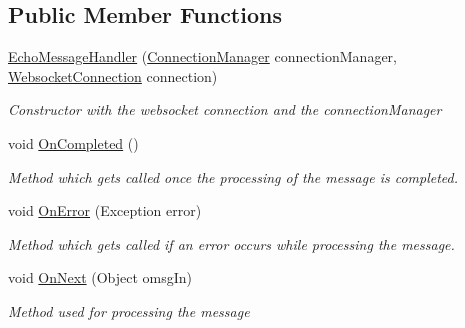 \subsection*{Public Member Functions}
\begin{DoxyCompactItemize}
\item 
\hyperlink{class_web_analyzer_1_1_server_1_1_message_handler_1_1_echo_message_handler_a24fde9b6bc5b7849cada3d74e378ce5c}{Echo\+Message\+Handler} (\hyperlink{class_web_analyzer_1_1_server_1_1_connection_manager}{Connection\+Manager} connection\+Manager, \hyperlink{class_web_analyzer_1_1_server_1_1_websocket_connection}{Websocket\+Connection} connection)
\begin{DoxyCompactList}\small\item\em Constructor with the websocket connection and the connection\+Manager \end{DoxyCompactList}\item 
void \hyperlink{class_web_analyzer_1_1_server_1_1_message_handler_1_1_echo_message_handler_a3c39add69c1acce076c0b6b664e6f245}{On\+Completed} ()
\begin{DoxyCompactList}\small\item\em Method which gets called once the processing of the message is completed. \end{DoxyCompactList}\item 
void \hyperlink{class_web_analyzer_1_1_server_1_1_message_handler_1_1_echo_message_handler_a840f12fc2e829ddb44d22de6241cf2eb}{On\+Error} (Exception error)
\begin{DoxyCompactList}\small\item\em Method which gets called if an error occurs while processing the message. \end{DoxyCompactList}\item 
void \hyperlink{class_web_analyzer_1_1_server_1_1_message_handler_1_1_echo_message_handler_a8e6f8c41a28dad12b96e8df754c87d4e}{On\+Next} (Object omsg\+In)
\begin{DoxyCompactList}\small\item\em Method used for processing the message \end{DoxyCompactList}\end{DoxyCompactItemize}
